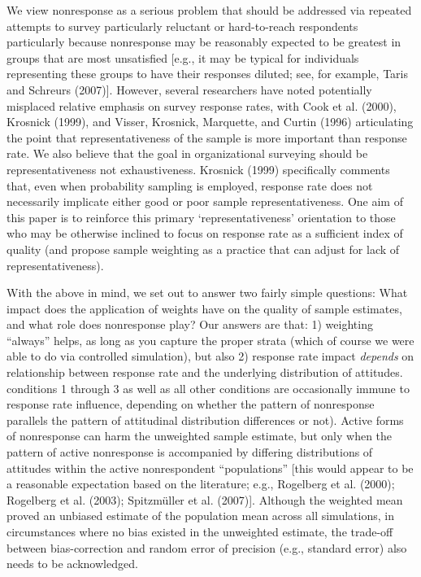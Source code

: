 \documentclass[
  ,man,floatsintext]{apa6}
\begin{document}
We view nonresponse as a serious problem that should be addressed via repeated attempts to survey particularly reluctant or hard-to-reach respondents particularly because nonresponse may be reasonably expected to be greatest in groups that are most unsatisfied {[}e.g., it may be typical for individuals representing these groups to have their responses diluted; see, for example, Taris and Schreurs (2007){]}. However, several researchers have noted potentially misplaced relative emphasis on survey response rates, with Cook et al. (2000), Krosnick (1999), and Visser, Krosnick, Marquette, and Curtin (1996) articulating the point that representativeness of the sample is more important than response rate. We also believe that the goal in organizational surveying should be representativeness not exhaustiveness. Krosnick (1999) specifically comments that, even when probability sampling is employed, response rate does not necessarily implicate either good or poor sample representativeness. One aim of this paper is to reinforce this primary `representativeness' orientation to those who may be otherwise inclined to focus on response rate as a sufficient index of quality (and propose sample weighting as a practice that can adjust for lack of representativeness).

With the above in mind, we set out to answer two fairly simple questions: What impact does the application of weights have on the quality of sample estimates, and what role does nonresponse play? Our answers are that: 1) weighting ``always'' helps, as long as you capture the proper strata (which of course we were able to do via controlled simulation), but also 2) response rate impact \emph{depends} on relationship between response rate and the underlying distribution of attitudes. conditions 1 through 3 as well as all other conditions are occasionally immune to response rate influence, depending on whether the pattern of nonresponse parallels the pattern of attitudinal distribution differences or not). Active forms of nonresponse can harm the unweighted sample estimate, but only when the pattern of active nonresponse is accompanied by differing distributions of attitudes within the active nonrespondent ``populations'' {[}this would appear to be a reasonable expectation based on the literature; e.g., Rogelberg et al. (2000); Rogelberg et al. (2003); Spitzmüller et al. (2007){]}. Although the weighted mean proved an unbiased estimate of the population mean across all simulations, in circumstances where no bias existed in the unweighted estimate, the trade-off between bias-correction and random error of precision (e.g., standard error) also needs to be acknowledged.
\end{document}
